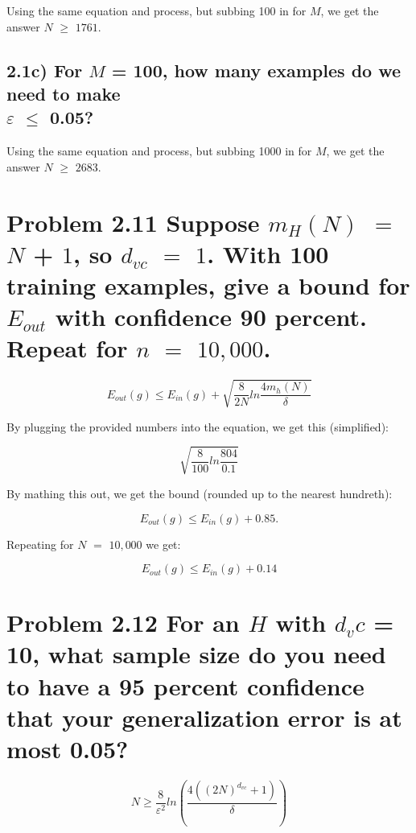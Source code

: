 \documentclass[11pt]{article}
\begin{document}
Using the same equation and process, but subbing 100 in for $M$, we get the answer $N$ $\geq$ $1761$.

\subsection*{2.1c)  For $M$ = 100, how many examples do we need to make \\ $\varepsilon$ $\leq$ 0.05?}

Using the same equation and process, but subbing 1000 in for $M$, we get the answer $N$ $\geq$ $2683$.

\section*{Problem 2.11  Suppose $m_H$$(N)$ $=$ $N$ + $1$, so $d_{vc}$ $=$ $1$. With 100 training examples, give a bound for $E_{out}$ with confidence 90 percent. Repeat for $n$ $=$ $10,000$.}

\begin{equation*}
E_{out}(g) \leq E_{in}(g) + \sqrt{\frac{8}{2N} ln \frac{4m_h(N)}{\delta}}
\end{equation*}

By plugging the provided numbers into the equation, we get this (simplified):

\begin{equation*}
\sqrt{\frac{8}{100} ln \frac{804}{0.1}}
\end{equation*}

By mathing this out, we get the bound (rounded up to the nearest hundreth):

\begin{equation*}
E_{out}(g) \leq E_{in}(g) + 0.85.
\end{equation*}

Repeating for $N$ $=$ $10,000$ we get:

\begin{equation*}
E_{out}(g) \leq E_{in}(g) + 0.14
\end{equation*}

\section*{Problem 2.12  For an $H$ with $d_vc$ = 10, what sample size do you need to have a 95 percent confidence that your  generalization error is at most 0.05?}
\begin{equation*}
N \geq \frac{8}{\varepsilon^2} ln (\frac{4((2N)^{d_{vc}} + 1)}{\delta})
\end{equation*}
\end{document}
